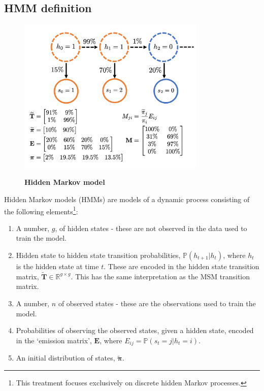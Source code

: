 \subsection{HMM definition}
\begin{figure}
    \centering
    \caption{\textbf{Hidden Markov model}}
    \includegraphics[width=0.8\textwidth]{chapters/theory/figures/hmm.png}
    \label{fig:theory_hmm}
\end{figure}
Hidden Markov models (HMMs) are models of a dynamic process consisting of the following elements\footnote{This treatment focuses exclusively on discrete hidden Markov processes.}\cite{rabinerTutorialHiddenMarkov1989}: 
\begin{enumerate}
    \item A number, $g$, of hidden states - these are not observed in the data used to train the model.  
    \item Hidden state to hidden state transition probabilities, $\mathbb{P}(h_{t+1}|h_{t})$, where $h_{t}$ is the hidden state at time $t$. These are encoded in the hidden state transition matrix, $\widetilde{\mathbf{T}}\in \mathbb{R}^{g \times g}$. This has the same interpretation as the MSM transition matrix.  
    \item A number, $n$ of observed states - these are the observations used to train the model. 
    \item Probabilities of observing the observed states, given a hidden state, encoded in the `emission matrix', $\mathbf{E}$, where  $E_{ij} = \mathbb{P}(s_t=j|h_t=i)$. 
    \item An initial distribution of states, $\widetilde{\bm{\pi}}$.
\end{enumerate}

